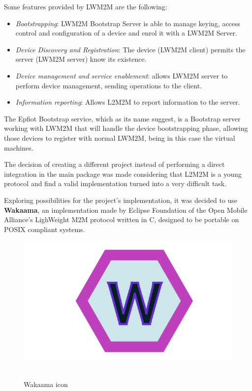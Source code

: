 Some features provided by LWM2M are the following:
\begin{itemize}
\item \textit{Bootstrapping}: LWM2M Bootstrap Server is able to manage keying, access control and configuration of a device and enrol it with a LWM2M Server.
\item \textit{Device Discovery and Registration}: The device (LWM2M client) permits the server (LWM2M server) know its existence.
\item \textit{Device management and service enablement}: allows LWM2M server to perform device management, sending operations to the client.
\item \textit{Information reporting}: Allows L2M2M to report information to the server.
\end{itemize}

The Epfiot Bootstrap service, which as its name suggest, is a Bootstrap server working with LWM2M that will handle the device bootstrapping phase, allowing those devices to register with normal LWM2M, being in this case the virtual machines.

The decision of creating a different project instead of performing a direct integration in the main package was made considering that L2M2M is a young protocol and find a valid implementation turned into a very difficult task.

Exploring possibilities for the project's implementation, it was decided to use \textbf{Wakaama}, an implementation made by Eclipse Foundation of the Open Mobile Alliance's LighWeight M2M protocol written in C, designed to be portable on POSIX compliant systems.

\begin{figure}[h]%
\centering
    \includegraphics[width=4.5in]{figures/Wakaama.png}
~\caption{Wakaama icon}
\label{figure3.6}
\end{figure}

